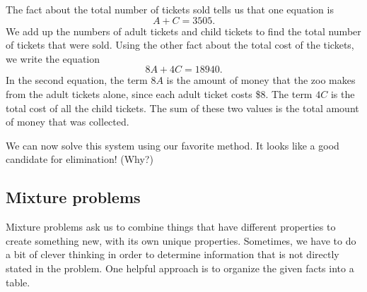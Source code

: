 

The fact about the total number of tickets sold tells us that one equation is
\[A+C=3505.\]
We add up the numbers of adult tickets and child tickets to find the total number of tickets that were sold. Using the other fact about the total cost of the tickets, we write the equation
\[8A+4C=18940.\]
In the second equation, the term $8A$ is the amount of money that the zoo makes from the adult tickets alone, since each adult ticket costs \$8. The term $4C$ is the total cost of all the child tickets. The sum of these two values is the total amount of money that was collected.

We can now solve this system using our favorite method. It looks like a good candidate for elimination! (Why?)

\subsection{Mixture problems}

Mixture problems ask us to combine things that have different properties to create something new, with its own unique properties. Sometimes, we have to do a bit of clever thinking in order to determine information that is not directly stated in the problem. One helpful approach is to organize the given facts into a table.


